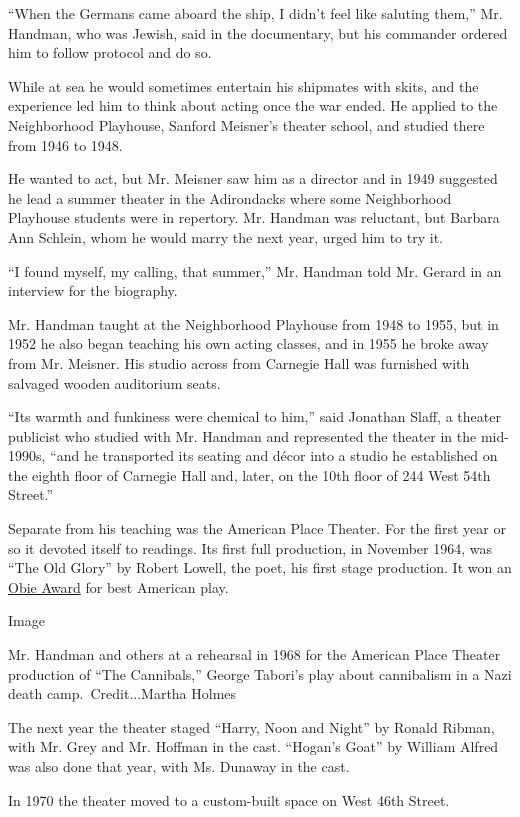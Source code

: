 ``When the Germans came aboard the ship, I didn't feel like saluting
them,'' Mr. Handman, who was Jewish, said in the documentary, but his
commander ordered him to follow protocol and do so.

While at sea he would sometimes entertain his shipmates with skits, and
the experience led him to think about acting once the war ended. He
applied to the Neighborhood Playhouse, Sanford Meisner's theater school,
and studied there from 1946 to 1948.

He wanted to act, but Mr. Meisner saw him as a director and in 1949
suggested he lead a summer theater in the Adirondacks where some
Neighborhood Playhouse students were in repertory. Mr. Handman was
reluctant, but Barbara Ann Schlein, whom he would marry the next year,
urged him to try it.

``I found myself, my calling, that summer,'' Mr. Handman told Mr. Gerard
in an interview for the biography.

Mr. Handman taught at the Neighborhood Playhouse from 1948 to 1955, but
in 1952 he also began teaching his own acting classes, and in 1955 he
broke away from Mr. Meisner. His studio across from Carnegie Hall was
furnished with salvaged wooden auditorium seats.

``Its warmth and funkiness were chemical to him,'' said Jonathan Slaff,
a theater publicist who studied with Mr. Handman and represented the
theater in the mid-1990s, ``and he transported its seating and décor
into a studio he established on the eighth floor of Carnegie Hall and,
later, on the 10th floor of 244 West 54th Street.''

Separate from his teaching was the American Place Theater. For the first
year or so it devoted itself to readings. Its first full production, in
November 1964, was ``The Old Glory'' by Robert Lowell, the poet, his
first stage production. It won an
\href{https://www.obieawards.com/events/1960s/year-65/}{Obie Award} for
best American play.

Image

Mr. Handman and others at a rehearsal in 1968 for the American Place
Theater production of ``The Cannibals,'' George Tabori's play about
cannibalism in a Nazi death camp.~Credit...Martha Holmes

The next year the theater staged ``Harry, Noon and Night'' by Ronald
Ribman, with Mr. Grey and Mr. Hoffman in the cast. ``Hogan's Goat'' by
William Alfred was also done that year, with Ms. Dunaway in the cast.

In 1970 the theater moved to a custom-built space on West 46th Street.

